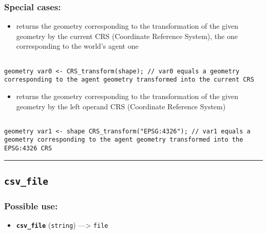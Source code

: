 \documentclass[]{book}
\providecommand{\tightlist}{%
  \setlength{\itemsep}{0pt}\setlength{\parskip}{0pt}}
\theoremstyle{definition}
\theoremstyle{definition}
\theoremstyle{definition}
\theoremstyle{remark}
\begin{document}
\subsubsection{Special cases:}\label{special-cases-45}

\begin{itemize}
\tightlist
\item
  returns the geometry corresponding to the transformation of the given
  geometry by the current CRS (Coordinate Reference System), the one
  corresponding to the world's agent one
\end{itemize}

\begin{verbatim}
 
geometry var0 <- CRS_transform(shape); // var0 equals a geometry corresponding to the agent geometry transformed into the current CRS
\end{verbatim}

\begin{itemize}
\tightlist
\item
  returns the geometry corresponding to the transformation of the given
  geometry by the left operand CRS (Coordinate Reference System)
\end{itemize}

\begin{verbatim}
 
geometry var1 <- shape CRS_transform("EPSG:4326"); // var1 equals a geometry corresponding to the agent geometry transformed into the EPSG:4326 CRS
\end{verbatim}

\begin{center}\rule{0.5\linewidth}{\linethickness}\end{center}

\subsection{\texorpdfstring{\texttt{csv\_file}}{csv\_file}}\label{csv_file}

\subsubsection{Possible use:}\label{possible-use-120}

\begin{itemize}
\tightlist
\item
  \textbf{\texttt{csv\_file}} (\texttt{string}) ---\textgreater{}
  \texttt{file}
\end{itemize}
\end{document}
